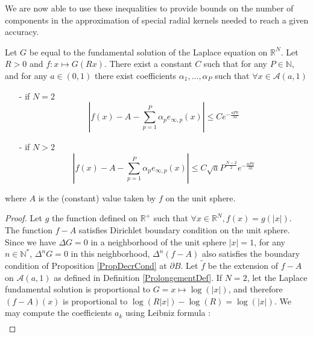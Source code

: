 \documentclass[11pt,a4paper]{article}
\begin{document}
We are now able to use these inequalities to provide bounds on the number of components in the approximation of special radial kernels needed to reach a given accuracy. 

\begin{The} Let $G$ be equal to the fundamental solution of the Laplace equation on $\mathbb{R}^N$. Let $R>0$ and $f : x\mapsto G(Rx)$. There exist a constant $C$ such that for any $P \in \mathbb{N}$, and for any $a \in (0,1)$ there exist coefficients $\alpha_1,...,\alpha_{P}$ such that $\forall x \in \mathcal{A}(a,1)$ 
\begin{itemize}
\item[-] if $N=2$ \[ \left| f(x) - A - \sum_{p=1}^P \alpha_p e_{\infty,p}(x)\right| \leq C e^{-\frac{aP\pi}{32}}\]
\item[-] if $N >2$ 
 \[ \left| f(x)- A - \sum_{p=1}^P \alpha_p e_{\infty,p}(x)\right| \leq C \sqrt{a} P^{\frac{N-2}{2}}e^{-\frac{aP\pi}{32}}\]
\end{itemize}
where $A$ is the (constant) value taken by $f$ on the unit sphere. 

\begin{proof}
Let $g$ the function defined on $\mathbb{R}^+$ such that $\forall x\in \mathbb{R}^N, f(x) = g(|x|)$. The function $f - A$ satisfies Dirichlet boundary condition on the unit sphere. Since we have $\Delta G = 0$ in a neighborhood of the unit sphere $|x|=1$, for any $n\in \mathbb{N}^*$, $\Delta^n G = 0$ in this neighborhood, $\Delta^n (f-A)$ also satisfies the boundary condition of Proposition \ref{PropDecrCond} at $\partial B$. Let $\tilde{f}$ be the extension of $f-A$ on $\mathcal{A}(a,1)$ as defined in Definition \ref{ProlongementDef}. If $N=2$, let the Laplace fundamental solution is proportional to $G= x\mapsto \log(|x|)$, and therefore $(f - A)(x)$ is proportional to $\log(R|x|) - \log(R) = \log(|x|)$. We may compute the coefficients $a_k$ using Leibniz formula : 
\[\begin{array}{rl}


\end{array}\]
\end{proof}
\end{The}
\end{document}
